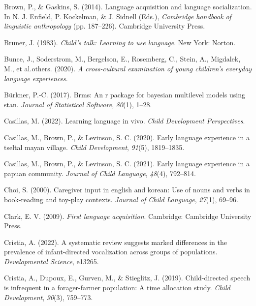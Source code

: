 \documentclass[
  man,floatsintext]{apa6}
\newlength{\cslhangindent}
\newlength{\cslentryspacingunit} %
\newenvironment{CSLReferences}[2] %
 {%
  \setlength{\parindent}{0pt}
  \ifodd #1
  \let\oldpar\par
  \def\par{\hangindent=\cslhangindent\oldpar}
  \fi
  \setlength{\parskip}{#2\cslentryspacingunit}
 }%
 {}
\begin{document}
\begin{CSLReferences}{1}{0}
\leavevmode{}%
Brown, P., \& Gaskins, S. (2014). Language acquisition and language socialization. In N. J. Enfield, P. Kockelman, \& J. Sidnell (Eds.), \emph{Cambridge handbook of linguistic anthropology} (pp. 187--226). Cambridge University Press.

\leavevmode{}%
Bruner, J. (1983). \emph{Child's talk: Learning to use language}. New York: Norton.

\leavevmode{}%
Bunce, J., Soderstrom, M., Bergelson, E., Rosemberg, C., Stein, A., Migdalek, M., et al.others. (2020). \emph{A cross-cultural examination of young children's everyday language experiences}.

\leavevmode{}%
Bürkner, P.-C. (2017). Brms: An r package for bayesian multilevel models using stan. \emph{Journal of Statistical Software}, \emph{80}(1), 1--28.

\leavevmode{}%
Casillas, M. (2022). Learning language in vivo. \emph{Child Development Perspectives}.

\leavevmode{}%
Casillas, M., Brown, P., \& Levinson, S. C. (2020). Early language experience in a tseltal mayan village. \emph{Child Development}, \emph{91}(5), 1819--1835.

\leavevmode{}%
Casillas, M., Brown, P., \& Levinson, S. C. (2021). Early language experience in a papuan community. \emph{Journal of Child Language}, \emph{48}(4), 792--814.

\leavevmode{}%
Choi, S. (2000). Caregiver input in english and korean: Use of nouns and verbs in book-reading and toy-play contexts. \emph{Journal of Child Language}, \emph{27}(1), 69--96.

\leavevmode{}%
Clark, E. V. (2009). \emph{First language acquisition}. Cambridge: Cambridge University Press.

\leavevmode{}%
Cristia, A. (2022). A systematic review suggests marked differences in the prevalence of infant-directed vocalization across groups of populations. \emph{Developmental Science}, e13265.

\leavevmode{}%
Cristia, A., Dupoux, E., Gurven, M., \& Stieglitz, J. (2019). Child-directed speech is infrequent in a forager-farmer population: A time allocation study. \emph{Child Development}, \emph{90}(3), 759--773.


\end{CSLReferences}
\end{document}
